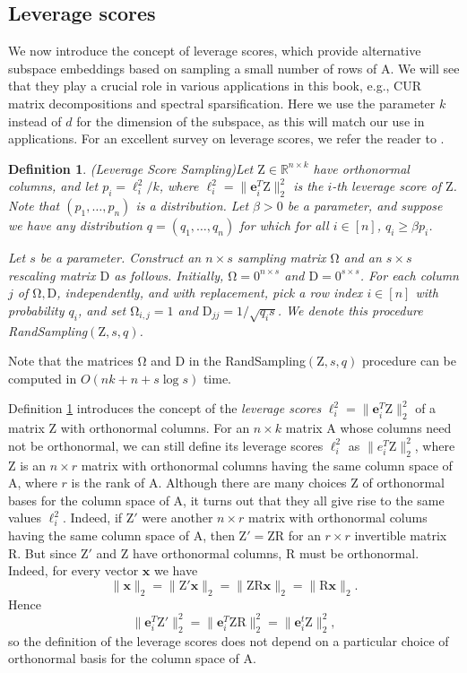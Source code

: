 \documentclass[11pt]{article}
\newtheorem{definition}[theorem]{Definition}
\newcommand{\mat}[1]{{\ensuremath{\bm{\mathrm{#1}}}}}
\def\e{{\mathbf e}}
\def\matA{\mat{A}}
\def\matD{\mat{D}}
\def\matR{\mat{R}}
\def\matZ{\mat{Z}}
\def\x{{\mathbf x}}
\begin{document}
\subsection{Leverage scores}\label{sec:leverage}
We now introduce the concept of leverage scores, which provide alternative subspace embeddings based on sampling
a small number of rows of $\matA$. We will see that they play a crucial role in various applications in this book,
e.g., CUR matrix decompositions and spectral sparsification. Here we use the parameter $k$ instead of $d$ for the dimension
of the subspace, as this will match our use in applications. For an excellent survey on leverage scores, we refer
the reader to \cite{m11}. 

\begin{definition}(Leverage Score Sampling)\label{def:lss}
Let $\matZ \in \mathbb{R}^{n \times k}$ have orthonormal columns, and let $p_i = \ell_i^2/k$, 
where $\ell_i^2 = \|\e_i^T \matZ\|_2^2$
is the $i$-th leverage score of $\matZ$. Note that $(p_1, \ldots, p_n)$ is a distribution. 
Let $\beta > 0$ be a parameter, and suppose we have any distribution $q = (q_1, \ldots, q_n)$ for which for
all $i \in [n]$, $q_i \geq \beta p_i$.

Let $s$ be a parameter. Construct an $n \times s$ 
sampling matrix $\mat\Omega$ and an $s \times s$ rescaling matrix $\matD$ as follows. 
Initially, $\mat\Omega = \mat0^{n \times s}$
and $\matD = \mat0^{s \times s}$. For each column $j$ of $\mat\Omega, \matD$, 
independently, and with replacement, pick a row index
$i \in [n]$ with probability $q_i$, and set $\mat\Omega_{i,j} = 1$ and 
$\matD_{jj} = 1/\sqrt{q_i s}$. We denote this procedure
{\textsc RandSampling}$(\matZ, s, q)$. 
\end{definition}
Note that the matrices $\mat\Omega$ and $\matD$ in the {\textsc RandSampling}$(\matZ, s, q)$ procedure 
can be computed in $O(nk + n + s \log s)$ time. 

Definition \ref{def:lss} introduces the concept of the {\it leverage scores} $\ell_i^2 = \|\e_i^T \matZ\|_2^2$ of a matrix 
$\matZ$ with orthonormal columns. For an $n \times k$ matrix $\matA$ whose columns need not be orthonormal, we can still
define its leverage scores $\ell_i^2$ as $\|e_i^T \matZ\|_2^2$, where $\matZ$ is an $n \times r$ matrix with orthonormal
columns having the same column space of $\matA$, where $r$ is the rank of $\matA$. Although there are many choices
$\matZ$ of orthonormal bases for the column space of $\matA$, it turns out that they all give rise to the same values
$\ell_i^2$. Indeed, if $\matZ'$ were another $n \times r$ matrix with orthonormal colums having the same column space
of $\matA$, then $\matZ' = \matZ \matR$ for an $r \times r$ invertible matrix $\matR$. But since $\matZ'$ and $\matZ$
have orthonormal columns, $\matR$ must be orthonormal. Indeed, for every vector $\x$ we have
$$\|\x\|_2 = \|\matZ'\x\|_2 = \|\matZ \matR \x\|_2 = \|\matR \x\|_2.$$
Hence $$\|\e_i^T\matZ'\|_2^2 = \|\e_i^T \matZ \matR\|_2^2 = \|\e_i^t \matZ\|_2^2,$$
so the definition of the leverage scores does not depend on a particular choice of orthonormal basis for the column space
of $\matA$.
\end{document}
